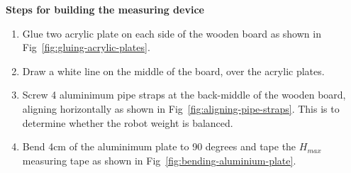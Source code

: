 {\textbf{Steps for building the measuring device}
\begin{enumerate}
\item Glue two acrylic plate on each side of the wooden board as shown in
  Fig~\ref{fig:gluing-acrylic-plates}.
\item Draw a white line on the middle of the board, over the acrylic plates.
\item Screw 4 aluminimum pipe straps at the back-middle of the wooden board,
aligning horizontally as shown in Fig~\ref{fig:aligning-pipe-straps}.
This is to determine whether the robot weight is balanced.
\item Bend 4cm of the aluminimum plate to 90 degrees and tape the $H_{max}$
  measuring tape as shown in Fig~\ref{fig:bending-aluminium-plate}.
\end{enumerate}

}
